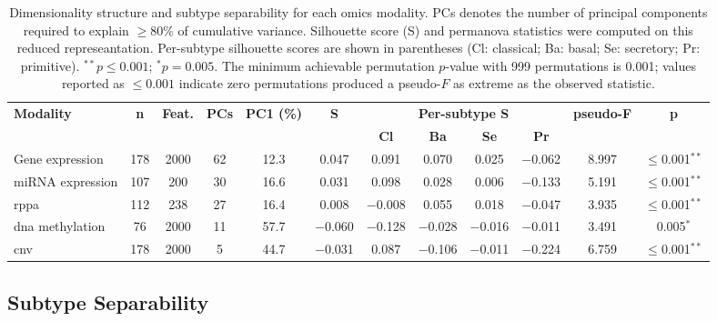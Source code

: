 \begin{table}[H]
\footnotesize
\caption[Dimensionality structure and subtype separability across omics modalities]{Dimensionality structure and subtype separability for each omics modality. PCs denotes the number of principal components required to explain $\ge 80\%$ of cumulative variance. Silhouette score (S) and \gls{permanova} statistics were computed on this reduced represeantation. Per-subtype silhouette scores are shown in parentheses (Cl: classical; Ba: basal; Se: secretory; Pr: primitive). $^{**}p \leq 0.001$; $^{*}p = 0.005$. The minimum achievable permutation $p$-value with 999 permutations is 0.001; values reported as $\leq 0.001$ indicate zero permutations produced a pseudo-$F$ as extreme as the observed statistic.}

\centering
\setlength{\tabcolsep}{3.5pt}
\begin{tabular}{lccccccccccc}
    \toprule
    \multirow{2}{*}{\textbf{Modality}} &
    \multirow{2}{*}{\textbf{n}} &
    \multirow{2}{*}{\textbf{Feat.}} &
    \multirow{2}{*}{\textbf{PCs}} &
    \multirow{2}{*}{\textbf{PC1 (\%)}} &
    \multirow{2}{*}{\textbf{S}} &
    \multicolumn{4}{c}{\textbf{Per-subtype S}} &
    \multirow{2}{*}{\textbf{pseudo-F}} &
    \multirow{2}{*}{\textbf{p}} \\
    \cmidrule(lr){7-10}
    & & & & & & \textbf{Cl} & \textbf{Ba} & \textbf{Se} & \textbf{Pr} & & \\
    \midrule
    Gene expression  & 178 & 2000 & 62 & 12.3 &  0.047
        &  0.091 &  0.070 &  0.025 & $-$0.062 & 8.997 & $\leq$0.001$^{**}$ \\
    miRNA expression & 107 & 200  & 30 & 16.6 &  0.031
        &  0.098 &  0.028 &  0.006 & $-$0.133 & 5.191 & $\leq$0.001$^{**}$ \\
    \gls{rppa}       & 112 & 238  & 27 & 16.4 &  0.008
        & $-$0.008 &  0.055 &  0.018 & $-$0.047 & 3.935 & $\leq$0.001$^{**}$ \\
    \gls{dna} methylation & 76  & 2000 & 11 & 57.7 & $-$0.060
        & $-$0.128 & $-$0.028 & $-$0.016 & $-$0.011 & 3.491 & 0.005$^{*}$ \\
    \gls{cnv}        & 178 & 2000 &  5 & 44.7 & $-$0.031
        &  0.087 & $-$0.106 & $-$0.011 & $-$0.224 & 6.759 & $\leq$0.001$^{**}$ \\
    \bottomrule
\end{tabular}
\label{tab:dataset_sep_summary}
\end{table}


\subsection{Subtype Separability}
\label{subsec:subtype_sep}

